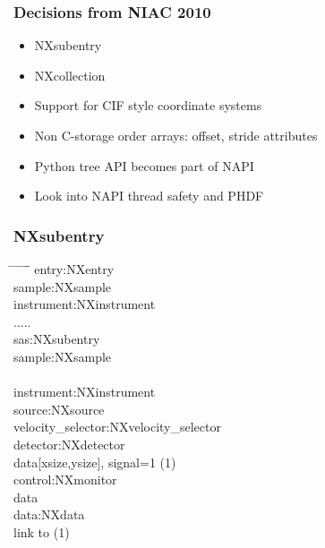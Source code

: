 \documentclass{beamer}
\begin{document}
\begin{frame}
\frametitle{Decisions from NIAC 2010}
\begin{itemize}
\item NXsubentry
\item NXcollection
\item Support for CIF style coordinate systems
\item Non C-storage order arrays: offset, stride attributes
\item Python tree API becomes part of NAPI
\item Look into NAPI thread safety and PHDF
\end{itemize}
\end{frame}

\begin{frame} \frametitle{NXsubentry}
\begin{tabbing}
\hspace*{1cm} \= \hspace*{1cm} \= \hspace*{1cm} \= \hspace*{1cm} \= \hspace*{1cm} \= \hspace*{1cm}\= \kill
entry:NXentry \\
\>sample:NXsample\\
\>instrument:NXinstrument\\
\>.....\\
 \>sas:NXsubentry\\
 \>  \>sample:NXsample \\
\\
\> \>instrument:NXinstrument\\
\> \> \> source:NXsource\\
\> \> \> velocity\_selector:NXvelocity\_selector\\
\> \> \> detector:NXdetector \\
\> \> \> \>data[xsize,ysize], signal=1 (1)\\
\> \>control:NXmonitor\\
\> \> \>data\\
\> \>data:NXdata\\
\> \> \> link to (1)\\
\end{tabbing}
\end{frame}
\end{document}
